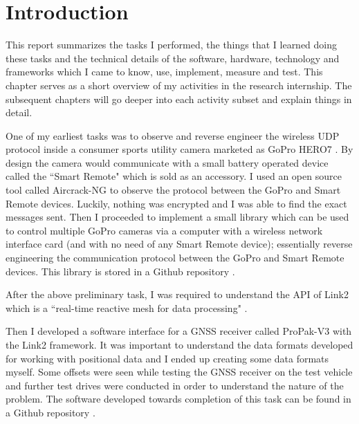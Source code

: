 \documentclass[a4paper, 12pt, oneside]{report}
\begin{document}
  
  \newpage
  
  
  
  \chapter{Introduction}
  
  \normalsize     This report summarizes the tasks I performed, the things that I learned doing these tasks and the technical details of the software, hardware, technology and frameworks which I came to know, use, implement, measure and test. This chapter serves as a short overview of my activities in the research internship. The subsequent chapters will go deeper into each activity subset and explain things in detail.
  
  One of my earliest tasks was to observe and reverse engineer the wireless UDP protocol inside a consumer sports utility camera marketed as GoPro HERO7 \cite{GoProHERO7BlackInsanelysmooth4kVideo-2020-02-12}. By design the camera would communicate with a small battery operated device called the ``Smart Remote" \cite{GoProSmartRemoteControl-2020-02-12} which is sold as an accessory. I used an open source tool called Aircrack-NG \cite{Aircrackng-2020-02-12} to observe the protocol between the GoPro and Smart Remote devices. Luckily, nothing was encrypted and I was able to find the exact messages sent. Then I proceeded to implement a small library which can be used to control multiple GoPro cameras via a computer with a wireless network interface card (and with no need of any Smart Remote \cite{GoProSmartRemoteControl-2020-02-12} device); essentially reverse engineering the communication protocol between the GoPro and Smart Remote devices. This library is stored in a Github repository \cite{NumericalAdvantageGoProHackHackingtheWirelessUDPcommunicationbetweenGoProHero7andSmartRemotedevice-2020-02-20}.
  
  After the above preliminary task, I was required to understand the API of Link2 \cite{ReactiveMeshforRealtimeDataProcessingDRAIVELinkDocumentation-2019-12-09} which is a ``real-time reactive mesh for data processing" \cite{ReactiveMeshforRealtimeDataProcessingDRAIVELinkDocumentation-2019-12-09}. 
  
  Then I developed a software interface for a GNSS \cite{WhatisGNSSEuropeanGlobalNavigationSatelliteSystemsAgency-2020-03-08} receiver called ProPak-V3 \cite{ProPakV3TripleFrequencyGNSSReceiverHighPrecisionGNSSGPSReceiversNovAtelGNSSReceiverNovAtel-2020-02-12} with the Link2 \cite{ReactiveMeshforRealtimeDataProcessingDRAIVELinkDocumentation-2019-12-09} framework. It was important to understand the data formats developed for working with positional data and I ended up creating some data formats myself. Some offsets were seen while testing the GNSS receiver on the test vehicle and further test drives were conducted in order to understand the nature of the problem. The software developed towards completion of this task can be found in a Github repository \cite{NumericalAdvantageldnodenovatelgnssins2ALink2nodetointerfacewiththeNovAtelPropakV3GNSSIMU-2020-02-20}.
  
\end{document}
